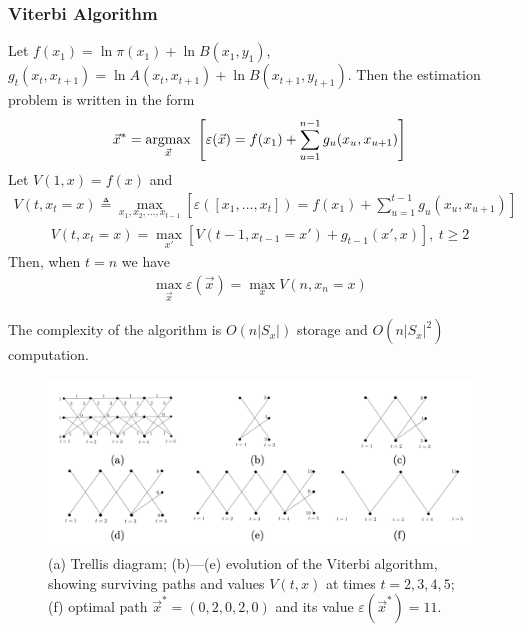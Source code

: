 \documentclass[11pt,a4paper]{article}
\newcommand{\argmax}{\operatornamewithlimits{argmax}}
\begin{document}
\subsubsection{Viterbi Algorithm}
Let $f(x_1)=\ln\pi(x_1)+\ln B(x_1,y_1)$, $g_t(x_t,x_{t+1})=\ln A(x_t,x_{t+1})+\ln B(x_{t+1},y_{t+1})$. Then the estimation problem is written in the form
\begin{equation}
    \begin{aligned}
        \vec{x}^*=\argmax_{\vec{x}}\ \left[\varepsilon (\vec{x})=f(x_1)+\sum_{u=1}^{n-1}g_u(x_u,x_{u+1})\right]
    \end{aligned}
    \nonumber
\end{equation}
Let $V(1,x)=f(x)$ and
\begin{equation}
    \begin{aligned}
        V(t,x_t=x)\triangleq \max_{x_1,x_2,...,x_{t-1}}\left[\varepsilon([x_1,...,x_t])=f(x_1)+\sum_{u=1}^{t-1}g_u(x_u,x_{u+1})\right]
    \end{aligned}
    \nonumber
\end{equation}
\begin{equation}
    \begin{aligned}
        V(t,x_t=x)=\max_{x'} \left[V(t-1,x_{t-1}=x')+g_{t-1}(x',x)\right],\ t\geq 2
    \end{aligned}
    \nonumber
\end{equation}
Then, when $t=n$ we have
\begin{equation}
    \begin{aligned}
        \max_{\vec{x}}\varepsilon(\vec{x})=\max_{x} V(n,x_n=x)
    \end{aligned}
    \nonumber
\end{equation}

The complexity of the algorithm is $O(n|S_x|)$ storage and $O(n|S_x|^2)$ computation.

\begin{center}\begin{figure}[htbp]
    \centering
    \includegraphics[scale=0.2]{dia.png}
    \caption{(a) Trellis diagram; (b)—(e) evolution of the Viterbi algorithm, showing surviving paths and values $V(t,x)$ at times $t = 2,3,4,5$; (f) optimal path $\vec{x}^* = (0,2,0,2,0)$ and its value $\varepsilon(\vec{x}^*) = 11$.}
    \label{}
\end{figure}\end{center}
\end{document}
